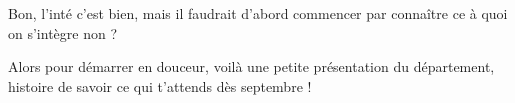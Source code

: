 Bon, l'inté c'est bien, mais il faudrait d'abord commencer par connaître ce à quoi on s'intègre non ? 

Alors pour démarrer en douceur, voilà une petite présentation du département, histoire de savoir ce qui t'attends dès septembre ! 
